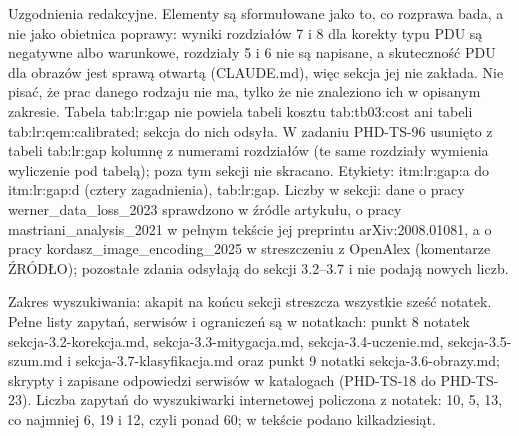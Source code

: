 {Uzgodnienia redakcyjne.
Elementy są sformułowane jako to, co rozprawa bada, a nie jako obietnica poprawy: wyniki rozdziałów 7 i 8 dla korekty typu PDU są negatywne albo warunkowe, rozdziały 5 i 6 nie są napisane, a skuteczność PDU dla obrazów jest sprawą otwartą (CLAUDE.md), więc sekcja jej nie zakłada.
Nie pisać, że prac danego rodzaju nie ma, tylko że nie znaleziono ich w opisanym zakresie.
Tabela tab:lr:gap nie powiela tabeli kosztu tab:tb03:cost ani tabeli tab:lr:qem:calibrated; sekcja do nich odsyła.
W zadaniu PHD-TS-96 usunięto z tabeli tab:lr:gap kolumnę z numerami rozdziałów (te same rozdziały wymienia wyliczenie pod tabelą); poza tym sekcji nie skracano.
Etykiety: itm:lr:gap:a do itm:lr:gap:d (cztery zagadnienia), tab:lr:gap.
Liczby w sekcji: dane o pracy werner_data_loss_2023 sprawdzono w źródle artykułu, o pracy mastriani_analysis_2021 w pełnym tekście jej preprintu arXiv:2008.01081, a o pracy kordasz_image_encoding_2025 w streszczeniu z OpenAlex (komentarze ŹRÓDŁO); pozostałe zdania odsyłają do sekcji 3.2--3.7 i nie podają nowych liczb.

Zakres wyszukiwania: akapit na końcu sekcji streszcza wszystkie sześć notatek.
Pełne listy zapytań, serwisów i ograniczeń są w notatkach: punkt 8 notatek sekcja-3.2-korekcja.md, sekcja-3.3-mitygacja.md, sekcja-3.4-uczenie.md, sekcja-3.5-szum.md i sekcja-3.7-klasyfikacja.md oraz punkt 9 notatki sekcja-3.6-obrazy.md; skrypty i zapisane odpowiedzi serwisów w katalogach  (PHD-TS-18 do PHD-TS-23).
Liczba zapytań do wyszukiwarki internetowej policzona z notatek: 10, 5, 13, co najmniej 6, 19 i 12, czyli ponad 60; w tekście podano kilkadziesiąt.

}
